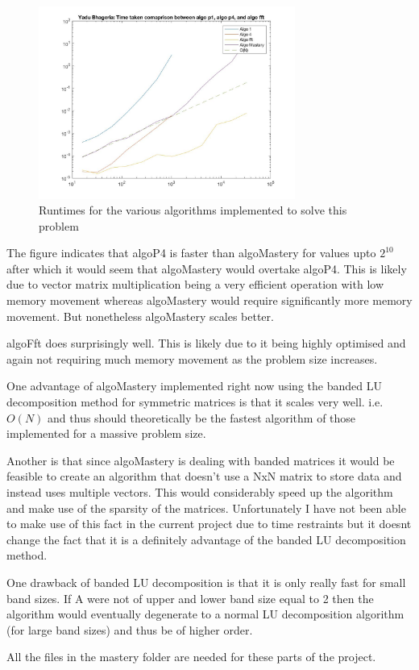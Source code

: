 \documentclass{article}
\begin{document}
\begin{enumerate}
\begin{enumerate}
		\begin{figure}[h!]
			\centering
			\includegraphics[width = 0.75\textwidth]{fig_1e15.jpg}
			\caption{Runtimes for the various algorithms implemented to solve this problem}
		\end{figure} 
		
		The figure indicates that algoP4 is faster than algoMastery for values upto $2^{10}$ after which it would seem that algoMastery would overtake algoP4. This is likely due to vector matrix multiplication being a very efficient operation with low memory movement whereas algoMastery would require significantly more memory movement. But nonetheless algoMastery scales better. 
		
		algoFft does surprisingly well. This is likely due to it being highly optimised and again not requiring much memory movement as the problem size increases. 
		
		One advantage of algoMastery implemented right now using the banded LU decomposition method for symmetric matrices is that it scales very well. i.e. $O(N)$ and thus should theoretically be the fastest algorithm of those implemented for a massive problem size. 
		
		Another is that since algoMastery is dealing with banded matrices it would be feasible to create an algorithm that doesn't use a NxN matrix to store data and instead uses multiple vectors. This would considerably speed up the algorithm and make use of the sparsity of the matrices. Unfortunately I have not been able to make use of this fact in the current project due to time restraints but it doesnt change the fact that it is a definitely advantage of the banded LU decomposition method. 
		
		One drawback of banded LU decomposition is that it is only really fast for small band sizes. If A were not of upper and lower band size equal to 2 then the algorithm would eventually degenerate to a normal LU decomposition algorithm (for large band sizes) and thus be of higher order.
		
		All the files in the mastery folder are needed for these parts of the project.
		
	\end{enumerate}
\end{enumerate}
\newpage
\end{document}
